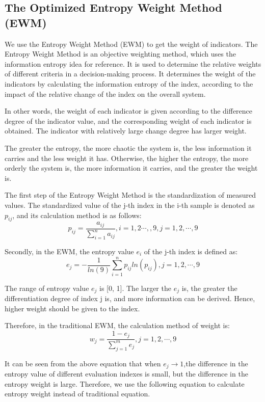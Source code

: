 \MinParskip{}

\subsection{The Optimized Entropy Weight Method (EWM) }
We use the Entropy Weight Method (EWM) to get the weight of indicators. The Entropy Weight Method is an objective weighting method, which uses the information entropy idea for reference. It is used to determine the relative weights of different criteria in a decision-making process. It determines the weight of the indicators by calculating the information entropy of the index, according to the impact of the relative change of the index on the overall system.

In other words, the weight of each indicator is given according to the difference degree of the indicator value, and the corresponding weight of each indicator is obtained. The indicator with relatively large change degree has larger weight. 

The greater the entropy, the more chaotic the system is, the less information it carries and the less weight it has. Otherwise, the higher the entropy, the more orderly the system is, the more information it carries, and the greater the weight is.

The first step of the Entropy Weight Method is the standardization of measured values. The standardized value of the j-th index in the i-th sample is denoted as $p_{ij}$, and its calculation method is as follows:$$p_{ij}=\frac{a_{ij}}{\sum_{i=1}^na_{ij}},i=1,2\cdots,,9,j=1,2,\cdots,9$$

Secondly, in the EWM, the entropy value $e_i$ of the j-th index is defined as:$$e_j=-\frac{1}{ln(9)}\sum_{i=1}^np_{ij}ln(p_{ij}),j=1,2,\cdots,9$$

The range of entropy value $e_j$ is [0, 1]. The larger the $e_j$ is, the greater the differentiation degree of index j is, and more information can be derived. Hence, higher weight should be given to the index. 

Therefore, in the traditional EWM, the calculation method of weight is:$$w_j=\frac{1-e_j}{\sum_{j=1}^me_j},j=1,2,\cdots,9$$

It can be seen from the above equation that when $e_j\rightarrow1$,the difference in the entropy value of different evaluation indexes is small, but the difference in the entropy weight is large. Therefore, we use the following equation to calculate entropy weight instead of traditional equation.

